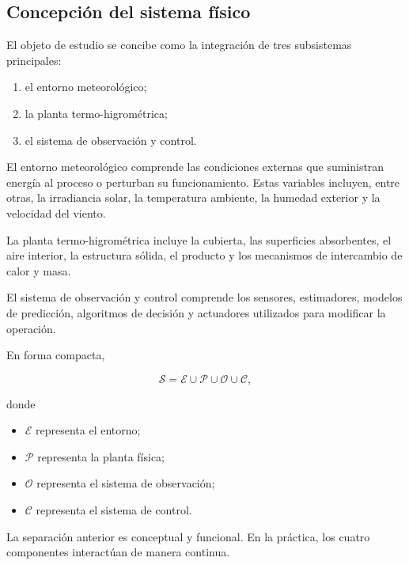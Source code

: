 \subsection{Concepción del sistema físico}
\label{subsec:concepcion_sistema_fisico}

El objeto de estudio se concibe como la integración de tres subsistemas principales:

\begin{enumerate}
    \item el entorno meteorológico;
    \item la planta termo-higrométrica;
    \item el sistema de observación y control.
\end{enumerate}

El entorno meteorológico comprende las condiciones externas que suministran energía al proceso o perturban su funcionamiento. Estas variables incluyen, entre otras, la irradiancia solar, la temperatura ambiente, la humedad exterior y la velocidad del viento.

La planta termo-higrométrica incluye la cubierta, las superficies absorbentes, el aire interior, la estructura sólida, el producto y los mecanismos de intercambio de calor y masa.

El sistema de observación y control comprende los sensores, estimadores, modelos de predicción, algoritmos de decisión y actuadores utilizados para modificar la operación.

En forma compacta,

\begin{equation}
\boxed{
\mathcal{S}
=
\mathcal{E}
\cup
\mathcal{P}
\cup
\mathcal{O}
\cup
\mathcal{C},
}
\label{eq:sistema_conceptual}
\end{equation}

donde

\begin{itemize}
    \item $\mathcal{E}$ representa el entorno;
    \item $\mathcal{P}$ representa la planta física;
    \item $\mathcal{O}$ representa el sistema de observación;
    \item $\mathcal{C}$ representa el sistema de control.
\end{itemize}

La separación anterior es conceptual y funcional. En la práctica, los cuatro componentes interactúan de manera continua.

